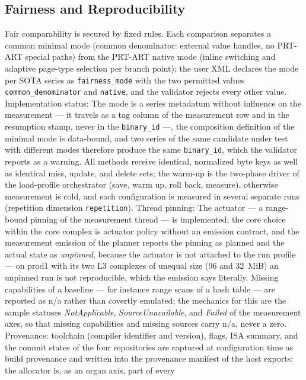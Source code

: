\begin{nurlang}
\subsection{Fairness and Reproducibility}\label{sec:fairness}
Fair comparability is secured by fixed rules. Each comparison separates a common minimal mode (common
denominator: external value handles, no PRT-ART special paths) from the PRT-ART native mode (inline
switching and adaptive page-type selection per branch point); the user XML declares the mode per SOTA
series as \texttt{fairness\_mode} with the two permitted values \texttt{common\_denominator} and
\texttt{native}, and the validator rejects every other value. Implementation status: The mode is a
series metadatum without influence on the measurement --- it travels as a tag column of the
measurement row and in the resumption stamp, never in the \texttt{binary\_id} ---, the composition
definition of the minimal mode is data-bound, and two series of the same candidate under test with different modes
therefore produce the same \texttt{binary\_id}, which the validator reports as a warning. All methods
receive identical, normalized byte keys as well as identical miss, update, and delete sets; the
warm-up is the two-phase driver of the load-profile orchestrator (save, warm up, roll back, measure),
otherwise measurement is cold, and each configuration is measured in several separate runs
(repetition dimension \texttt{repetition}). Thread pinning: The actuator --- a range-bound pinning of
the measurement thread --- is implemented; the core choice within the core complex is actuator policy
without an emission contract, and the measurement emission of the planner reports the pinning as
planned and the actual state as \emph{unpinned}, because the actuator is not attached to the run
profile --- on prod1 with its two L3 complexes of unequal size (96 and 32~MiB) an unpinned run is not
reproducible, which the emission says literally. Missing capabilities of a baseline --- for instance
range scans of a hash table --- are reported as n/a rather than covertly emulated; the mechanics for
this are the sample statuses \emph{NotApplicable}, \emph{SourceUnavailable}, and \emph{Failed} of
the measurement axes, so that missing capabilities and missing sources carry n/a, never a zero.
Provenance: toolchain (compiler identifier and version), flags, ISA summary, and the commit states of
the four repositories are captured at configuration time as build provenance and written into the
provenance manifest of the host exports; the allocator is, as an organ axis, part of every

\end{nurlang}
